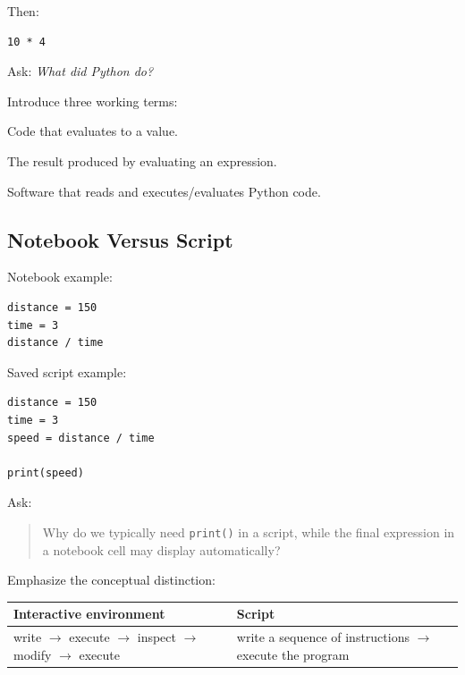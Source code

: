 \documentclass[11pt]{article}
\begin{document}
Then:

\begin{lstlisting}
10 * 4
\end{lstlisting}

Ask: \emph{What did Python do?}

Introduce three working terms:

\begin{description}[style=nextline]
    \item[Expression] Code that evaluates to a value.
    \item[Value] The result produced by evaluating an expression.
    \item[Interpreter] Software that reads and executes/evaluates Python code.
\end{description}

\subsection*{Notebook Versus Script}

Notebook example:

\begin{lstlisting}
distance = 150
time = 3
distance / time
\end{lstlisting}

Saved script example:

\begin{lstlisting}
distance = 150
time = 3
speed = distance / time

print(speed)
\end{lstlisting}

Ask:

\begin{quote}
Why do we typically need \texttt{print()} in a script, while the final expression in a notebook cell may display automatically?
\end{quote}

Emphasize the conceptual distinction:

\begin{center}
\begin{tabular}{p{} p{}}
\toprule
\textbf{Interactive environment} & \textbf{Script} \\
\midrule
write $\rightarrow$ execute $\rightarrow$ inspect $\rightarrow$ modify $\rightarrow$ execute &
write a sequence of instructions $\rightarrow$ execute the program \\
\bottomrule
\end{tabular}
\end{center}
\end{document}
